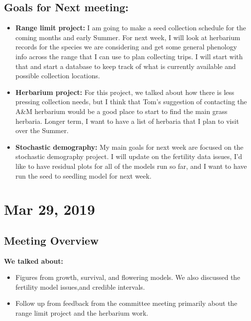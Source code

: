 \documentclass{article}
\begin{document}
\subsection*{Goals for Next meeting:}
\begin{itemize}
\item{\textbf{Range limit project:} I am going to make a seed collection schedule for the coming months and early Summer. For next week, I will look at herbarium records for the species we are considering and get some general phenology info across the range that I can use to plan collecting trips. I will start with that and start a database to keep track of what is currently available and possible collection locations.}
\item{\textbf{Herbarium project:} For this project, we talked about how there is less pressing collection needs, but I think that Tom's suggestion of contacting the A\&M herbarium would be a good place to start to find the main grass herbaria. Longer term, I want to have a list of herbaria that I plan to visit over the Summer.}
\item{\textbf{Stochastic demography:} My main goals for next week are focused on the stochastic demography project. I will update on the fertility data issues, I'd like to have residual plots for all of the models run so far, and I want to have run the seed to seedling model for next week.}
\end{itemize}


\section*{Mar 29, 2019}
\subsection*{Meeting Overview}
\textbf{We talked about:}
\begin{itemize}
\item{Figures from growth, survival, and flowering models. We also discussed the fertility model issues,and credible intervals.}
\item{Follow up from feedback from the committee meeting primarily about the range limit project and the herbarium work.}
\end{itemize}
\end{document}
